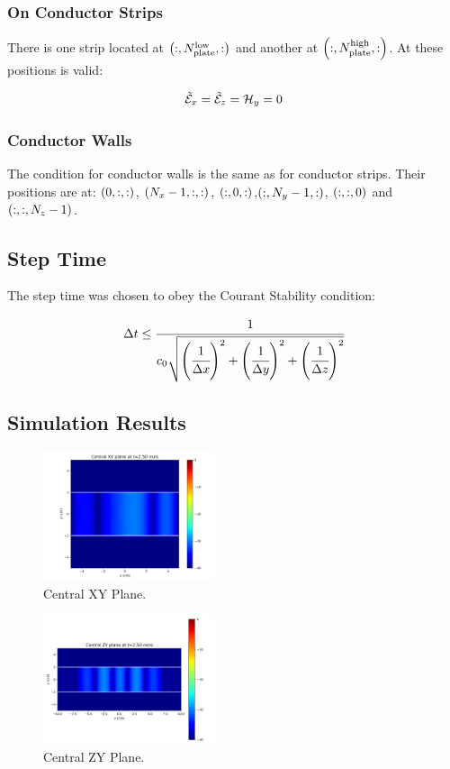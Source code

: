 \subsubsection{On Conductor Strips}\hfill

There is one strip located at $\pare{:, N_{\textnormal{plate}}^{\textnormal{low}}, :}$ and another at $\pare{:, N_{\textnormal{plate}}^{\textnormal{high}}, :}$. At these positions is valid:

\begin{align}
    \tilde{\mathcal{E}}_x = \tilde{\mathcal{E}}_z = \mathcal{H}_y = 0
\end{align}

\subsubsection{Conductor Walls}\hfill

The condition for conductor walls is the same as for conductor strips. Their positions are at: $\pare{0, :, :}$, $\pare{N_x-1, :, :}$, $\pare{:, 0, :}$,$\pare{:, N_y-1, :}$, $\pare{:, :, 0}$ and $\pare{:, :, N_z-1}$.

\subsection{Step Time}

The step time was chosen to obey the Courant Stability condition:

\begin{equation}
    \dt \leq \cfrac{1}{c_0\sqrt{\pare{\cfrac{1}{\dx}}^2 + \pare{\cfrac{1}{\dy}}^2 + \pare{\cfrac{1}{\dz}}^2}}
\end{equation}

\subsection{Simulation Results}

\begin{figure}[H]
    \centering
    \includegraphics[width=0.45\textwidth]{contents/central_xy_plane.png}
    \caption{Central XY Plane.}
\end{figure}

\begin{figure}[H]
    \centering
    \includegraphics[width=0.45\textwidth]{contents/central_zy_plane.png}
    \caption{Central ZY Plane.}
\end{figure}